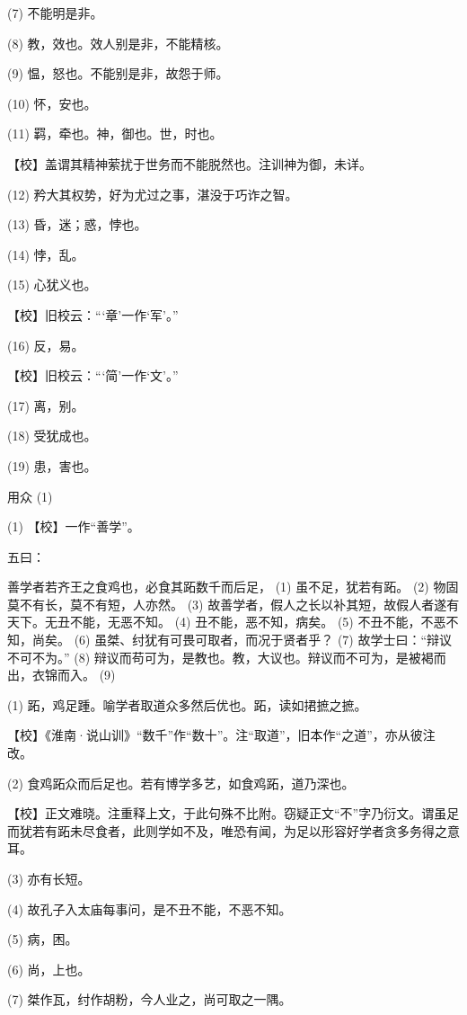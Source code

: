 \documentclass[12pt,UTF8]{ctexbook}
\begin{document}
(7) 不能明是非。

(8) 教，效也。效人别是非，不能精核。

(9) 愠，怒也。不能别是非，故怨于师。

(10) 怀，安也。

(11) 羁，牵也。神，御也。世，时也。

【校】盖谓其精神萦扰于世务而不能脱然也。注训神为御，未详。

(12) 矜大其权势，好为尤过之事，湛没于巧诈之智。

(13) 昏，迷；惑，悖也。

(14) 悖，乱。

(15) 心犹义也。

【校】旧校云：“‘章’一作‘军’。”

(16) 反，易。

【校】旧校云：“‘简’一作‘文’。”

(17) 离，别。

(18) 受犹成也。

(19) 患，害也。





用众 (1)


(1) 【校】一作“善学”。

五曰：

善学者若齐王之食鸡也，必食其跖数千而后足， (1) 虽不足，犹若有跖。 (2) 物固莫不有长，莫不有短，人亦然。 (3) 故善学者，假人之长以补其短，故假人者遂有天下。无丑不能，无恶不知。 (4) 丑不能，恶不知，病矣。 (5) 不丑不能，不恶不知，尚矣。 (6) 虽桀、纣犹有可畏可取者，而况于贤者乎？ (7) 故学士曰：“辩议不可不为。” (8) 辩议而苟可为，是教也。教，大议也。辩议而不可为，是被褐而出，衣锦而入。 (9)

(1) 跖，鸡足踵。喻学者取道众多然后优也。跖，读如捃摭之摭。

【校】《淮南·说山训》“数千”作“数十”。注“取道”，旧本作“之道”，亦从彼注改。

(2) 食鸡跖众而后足也。若有博学多艺，如食鸡跖，道乃深也。

【校】正文难晓。注重释上文，于此句殊不比附。窃疑正文“不”字乃衍文。谓虽足而犹若有跖未尽食者，此则学如不及，唯恐有闻，为足以形容好学者贪多务得之意耳。

(3) 亦有长短。

(4) 故孔子入太庙每事问，是不丑不能，不恶不知。

(5) 病，困。

(6) 尚，上也。

(7) 桀作瓦，纣作胡粉，今人业之，尚可取之一隅。
\end{document}
